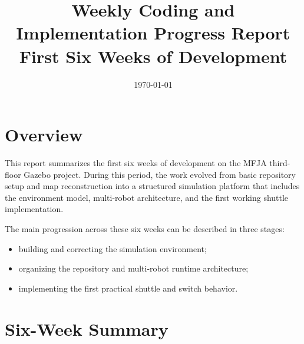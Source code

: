 \documentclass[11pt,a4paper]{article}
\title{Weekly Coding and Implementation Progress Report\\First Six Weeks of Development}
\author{}
\date{\today}
\begin{document}
\maketitle

\section*{Overview}

This report summarizes the first six weeks of development on the MFJA
third-floor Gazebo project. During this period, the work evolved from basic
repository setup and map reconstruction into a structured simulation platform
that includes the environment model, multi-robot architecture, and the first
working shuttle implementation.

The main progression across these six weeks can be described in three stages:

\begin{itemize}
\item building and correcting the simulation environment;
\item organizing the repository and multi-robot runtime architecture;
\item implementing the first practical shuttle and switch behavior.
\end{itemize}

\section*{Six-Week Summary}
\end{document}
